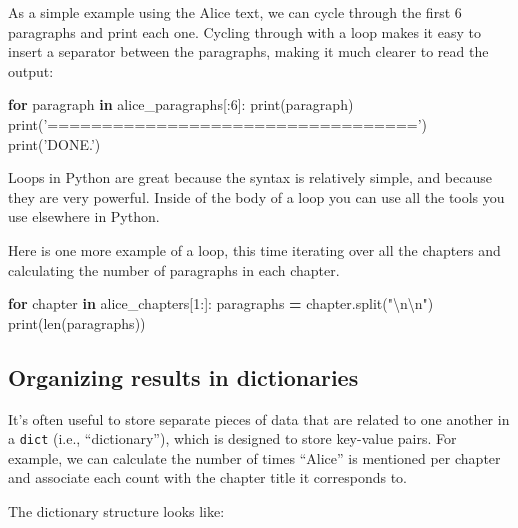 \documentclass[
]{book}
\newenvironment{Shaded}{\begin{snugshade}}{\end{snugshade}}
\newcommand{\BuiltInTok}[1]{#1}
\newcommand{\CharTok}[1]{\textcolor[rgb]{0.31,0.60,0.02}{#1}}
\newcommand{\ControlFlowTok}[1]{\textcolor[rgb]{0.13,0.29,0.53}{\textbf{#1}}}
\newcommand{\DecValTok}[1]{\textcolor[rgb]{0.00,0.00,0.81}{#1}}
\newcommand{\KeywordTok}[1]{\textcolor[rgb]{0.13,0.29,0.53}{\textbf{#1}}}
\newcommand{\NormalTok}[1]{#1}
\newcommand{\OperatorTok}[1]{\textcolor[rgb]{0.81,0.36,0.00}{\textbf{#1}}}
\newcommand{\StringTok}[1]{\textcolor[rgb]{0.31,0.60,0.02}{#1}}
\begin{document}
As a simple example using the Alice text, we can cycle through the first 6 paragraphs and print each one. Cycling through with a loop makes it easy to insert a separator between the paragraphs, making it much clearer to read the output:

\begin{Shaded}
\begin{Highlighting}[]
\ControlFlowTok{for}\NormalTok{ paragraph }\KeywordTok{in}\NormalTok{ alice_paragraphs[:}\DecValTok{6}\NormalTok{]:}
    \BuiltInTok{print}\NormalTok{(paragraph)}
    \BuiltInTok{print}\NormalTok{(}\StringTok{'=================================='}\NormalTok{)}
\BuiltInTok{print}\NormalTok{(}\StringTok{'DONE.'}\NormalTok{)}
\end{Highlighting}
\end{Shaded}

Loops in Python are great because the syntax is relatively simple, and because they are very powerful. Inside of the body of a loop you can use all the tools you use elsewhere in Python.

Here is one more example of a loop, this time iterating over all the chapters and calculating the number of paragraphs in each chapter.

\begin{Shaded}
\begin{Highlighting}[]
\ControlFlowTok{for}\NormalTok{ chapter }\KeywordTok{in}\NormalTok{ alice_chapters[}\DecValTok{1}\NormalTok{:]:}
\NormalTok{    paragraphs }\OperatorTok{=}\NormalTok{ chapter.split(}\StringTok{"}\CharTok{\textbackslash{}n\textbackslash{}n}\StringTok{"}\NormalTok{)}
    \BuiltInTok{print}\NormalTok{(}\BuiltInTok{len}\NormalTok{(paragraphs))}
\end{Highlighting}
\end{Shaded}

\hypertarget{organizing-results-in-dictionaries}{%
\subsection{Organizing results in dictionaries}\label{organizing-results-in-dictionaries}}

It's often useful to store separate pieces of data that are related to one another in a \texttt{dict} (i.e., ``dictionary''), which is designed to store key-value pairs. For example, we can calculate the number of times ``Alice'' is mentioned per chapter and associate each count with the chapter title it corresponds to.

The dictionary structure looks like:
\end{document}
